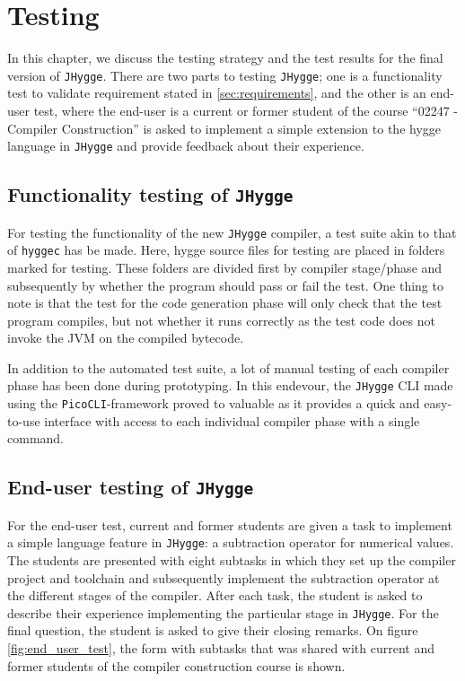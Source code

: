 \chapter{Testing}\label{sec:testing}

In this chapter, we discuss the testing strategy and the test results for the final version of \texttt{JHygge}.
There are two parts to testing \texttt{JHygge}; one is a functionality test to validate requirement stated in \ref{sec:requirements},
and the other is an end-user test, where the end-user is a current or former student of the course ``02247 - Compiler Construction''
is asked to implement a simple extension to the hygge language in \texttt{JHygge} and provide feedback about their experience.

\section{Functionality testing of \texttt{JHygge}}

For testing the functionality of the new \texttt{JHygge} compiler, a test suite akin to that of \texttt{hyggec} has be made.
Here, hygge source files for testing are placed in folders marked for testing. These folders are divided first by compiler
stage/phase and subsequently by whether the program should pass or fail the test. One thing to note is that the test
for the code generation phase will only check that the test program compiles, but not whether it runs correctly as the
test code does not invoke the JVM on the compiled bytecode.

In addition to the automated test suite, a lot of manual testing of each compiler phase has been done during prototyping.
In this endevour, the \texttt{JHygge} CLI made using the \texttt{PicoCLI}-framework\cite{picocli} proved to valuable as it provides a
quick and easy-to-use interface with access to each individual compiler phase with a single command.

\section{End-user testing of \texttt{JHygge}}

For the end-user test, current and former students are given a task to implement a simple language feature in \texttt{JHygge}:
a subtraction operator for numerical values. The students are presented with eight subtasks in which they set up the compiler
project and toolchain and subsequently implement the subtraction operator at the different stages of the compiler. After
each task, the student is asked to describe their experience implementing the particular stage in \texttt{JHygge}. For the
final question, the student is asked to give their closing remarks. On figure \ref{fig:end_user_test}, the form with subtasks
that was shared with current and former students of the compiler construction course is shown.

